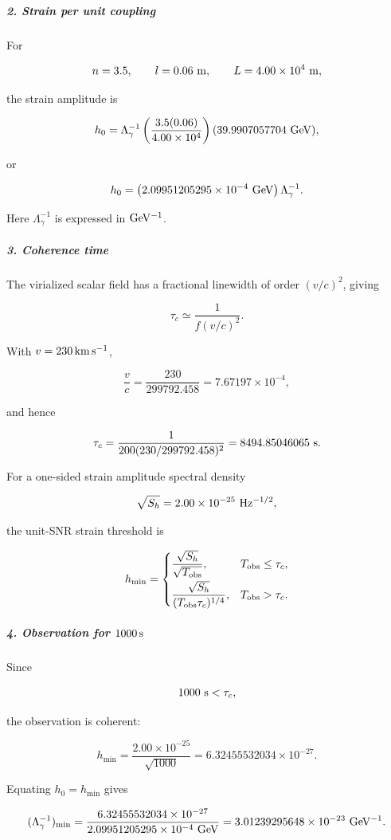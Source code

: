 \subparagraph*{2. Strain per unit coupling}

For

\[
n=3.5,\qquad l=0.06\ {\rm m},\qquad L=4.00\times10^4\ {\rm m},
\]

the strain amplitude is

\[
h_0 = \Lambda_\gamma^{-1} \left(\frac{3.5(0.06)}{4.00\times10^4}\right) (39.9907057704\ {\rm GeV}),
\]

or

\[
h_0 = \left(2.09951205295\times10^{-4}\ {\rm GeV}\right) \Lambda_\gamma^{-1}.
\]

Here $\Lambda_\gamma^{-1}$ is expressed in ${\rm GeV^{-1}}$.

\subparagraph*{3. Coherence time}

The virialized scalar field has a fractional linewidth of order $(v/c)^2$, giving

\[
\tau_c \simeq \frac{1}{f(v/c)^2}.
\]

With $v=230\,{\rm km\,s^{-1}}$,

\[
\frac{v}{c} = \frac{230}{299792.458} = 7.67197\times10^{-4},
\]

and hence

\[
\tau_c = \frac{1} {200(230/299792.458)^2} = 8494.85046065\ {\rm s}.
\]

For a one-sided strain amplitude spectral density

\[
\sqrt{S_h}=2.00\times10^{-25}\ {\rm Hz^{-1/2}},
\]

the unit-SNR strain threshold is

\[
h_{\min}=
\begin{cases}
\dfrac{\sqrt{S_h}}{\sqrt{T_{\rm obs}}},
& T_{\rm obs}\leq\tau_c,\\[8pt]
\dfrac{\sqrt{S_h}}{(T_{\rm obs}\tau_c)^{1/4}},
& T_{\rm obs}>\tau_c.
\end{cases}
\]

\subparagraph*{4. Observation for $1000\,{\rm s}$}

Since

\[
1000\ {\rm s}<\tau_c,
\]

the observation is coherent:

\[
h_{\min} = \frac{2.00\times10^{-25}}{\sqrt{1000}} = 6.32455532034\times10^{-27}.
\]

Equating $h_0=h_{\min}$ gives

\[
(\Lambda_\gamma^{-1})_{\min} = \frac{6.32455532034\times10^{-27}} {2.09951205295\times10^{-4}\ {\rm GeV}} = 3.01239295648\times10^{-23}\ {\rm GeV^{-1}}.
\]

